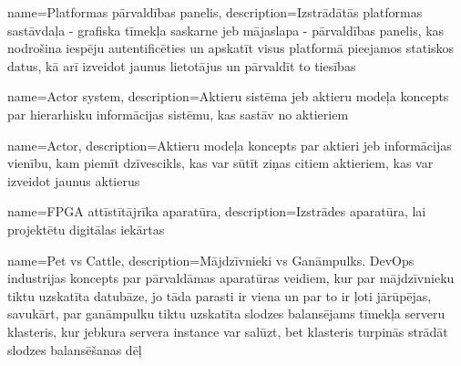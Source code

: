 {
    name=Platformas pārvaldības panelis,
    description={Izstrādātās platformas sastāvdaļa - grafiska tīmekļa saskarne jeb mājaslapa - pārvaldības panelis, 
        kas nodrošina iespēju autentificēties un apskatīt visus platformā pieejamos statiskos datus, kā arī izveidot
        jaunus lietotājus un pārvaldīt to tiesības}
}

{
    name=Actor system,
    description={Aktieru sistēma jeb aktieru modeļa koncepts par hierarhisku informācijas sistēmu, kas sastāv no aktieriem}
}

{
    name=Actor,
    description={Aktieru modeļa koncepts par aktieri jeb informācijas vienību, kam piemīt dzīvescikls, 
        kas var sūtīt ziņas citiem aktieriem, kas var izveidot jaunus aktierus}
}

{
    name=FPGA attīstītājrīka aparatūra,
    description={Izstrādes aparatūra, lai projektētu digitālas iekārtas}
}

{
    name=Pet vs Cattle,
    description={Mājdzīvnieki vs Ganāmpulks. DevOps industrijas koncepts par pārvaldāmas aparatūras veidiem, kur
        par mājdzīvnieku tiktu uzskatīta datubāze, jo tāda parasti ir viena un par to ir ļoti jārūpējas, savukārt,
        par ganāmpulku tiktu uzskatīta slodzes balansējams tīmekļa serveru klasteris, kur jebkura servera instance
        var salūzt, bet klasteris turpinās strādāt slodzes balansēšanas dēļ}
}